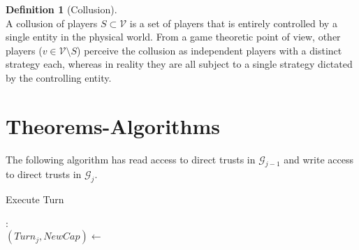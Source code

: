 \documentclass[11pt]{article}
\theoremstyle{definition}
\newtheorem{definition}{Definition}[section]
\theoremstyle{corollary}
\theoremstyle{lemma}
\begin{document}
     \begin{definition}[Collusion] \ \\
        A collusion of players $S \subset \mathcal{V}$ is a set of players that is entirely controlled by a single entity in
        the physical world. From a game theoretic point of view, other players ($v \in \mathcal{V} \setminus S$) perceive
        the collusion as independent players with a distinct strategy each, whereas in reality they are all subject to a
        single strategy dictated by the controlling entity.
     \end{definition}
  \section{Theorems-Algorithms}
    The following algorithm has read access to direct trusts in $\mathcal{G}_{j-1}$ and write access to direct trusts in
    $\mathcal{G}_j$.
    \begin{algorithm}[H]
       \label{executeturn}
       \caption{Execute Turn}
        : \\ {
          $(Turn_j, NewCap) \gets$  \\
          } 
    \end{algorithm}
\end{document}
